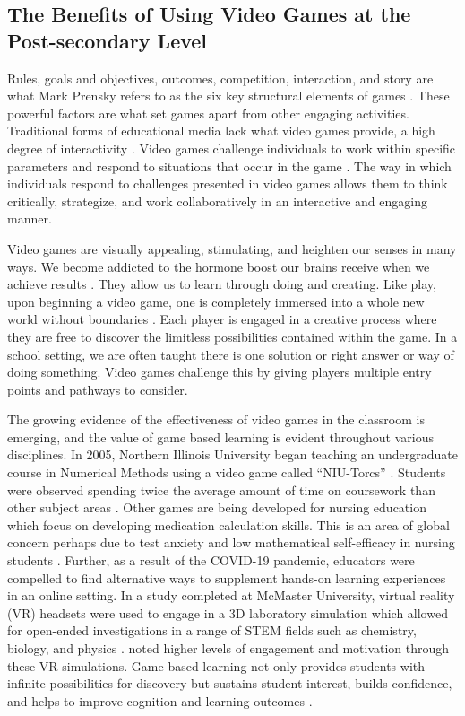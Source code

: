 \documentclass[10pt]{article}
\begin{document}
\subsection{The Benefits of Using Video Games at the Post-secondary Level}

 Rules, goals and objectives, outcomes, competition, interaction, and story are what Mark Prensky refers to as the six key structural elements of games \citep{prensky2001fun}. These powerful factors are what set games apart from other engaging activities. Traditional forms of educational media lack what video games provide, a high degree of interactivity \citep{coller2009effectiveness}. Video games challenge individuals to work within specific parameters and respond to situations that occur in the game \citep{coller2009effectiveness}. The way in which individuals respond to challenges presented in video games allows them to think critically, strategize, and work collaboratively in an interactive and engaging manner.

Video games are visually appealing, stimulating, and heighten our senses in many ways. We become addicted to the hormone boost our brains receive when we achieve results \citep{tomavska2022let}. They allow us to learn through doing and creating. Like play, upon beginning a video game, one is completely immersed into a whole new world without boundaries \citep{coller2009effectiveness}. Each player is engaged in a creative process where they are free to discover the limitless possibilities contained within the game. In a school setting, we are often taught there is one solution or right answer or way of doing something. Video games challenge this by giving players multiple entry points and pathways to consider.

The growing evidence of the effectiveness of video games in the classroom is emerging, and the value of game based learning is evident throughout various disciplines. In 2005, Northern Illinois University began teaching an undergraduate course in Numerical Methods using a video game called “NIU-Torcs” \citep{coller2009effectiveness}. Students were observed spending twice the average amount of time on coursework than other subject areas \citep{coller2009effectiveness}. Other games are being developed for nursing education which focus on developing medication calculation skills. This is an area of global concern perhaps due to test anxiety and low mathematical self-efficacy in nursing students \citep{foss2013medication}. Further, as a result of the COVID-19 pandemic, educators were compelled to find alternative ways to supplement hands-on learning experiences in an online setting. In a study completed at McMaster University, virtual reality (VR) headsets were used to engage in a 3D laboratory simulation which allowed for open-ended investigations in a range of STEM fields such as chemistry, biology, and physics \citep{tsirulnikov2023game}. \citet{tsirulnikov2023game} noted higher levels of engagement and motivation through these VR simulations. Game based learning not only provides students with infinite possibilities for discovery but sustains student interest, builds confidence, and helps to improve cognition and learning outcomes \citep{divjak2011impact}.
\end{document}
